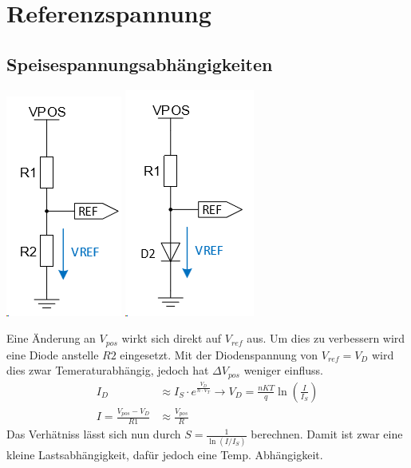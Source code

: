 \section{Referenzspannung}
\subsection{Speisespannungsabhängigkeiten}
\begin{center}
	\includegraphics[width=0.2\columnwidth]{Images/widerstandteiler}
	\includegraphics[width=0.22\columnwidth]{Images/widerstandsteiler_diode}
\end{center}
Eine Änderung an $V_{pos}$ wirkt sich direkt auf $V_{ref}$ aus. Um dies zu verbessern wird eine Diode anstelle $R2$ eingesetzt. Mit der Diodenspannung von $V_{ref} = V_D$ wird dies zwar Temeraturabhängig, jedoch hat $\Delta V_{pos}$ weniger einfluss.
\begin{align*}
	I_D &\approx I_S \cdot e^{\frac{V_D}{n\cdot V_T}} \xrightarrow{} V_D = \frac{nKT}{q}\ln\left(\frac{I}{I_S}\right) \\
	I = \frac{V_{pos} - V_D}{R1} &\approx \frac{V_{pos}}{R}
\end{align*}
Das Verhätniss lässt sich nun durch $S = \frac{1}{\ln\left(I/I_S\right)}$ berechnen. Damit ist zwar eine kleine Lastsabhängigkeit, dafür jedoch eine Temp. Abhängigkeit.

